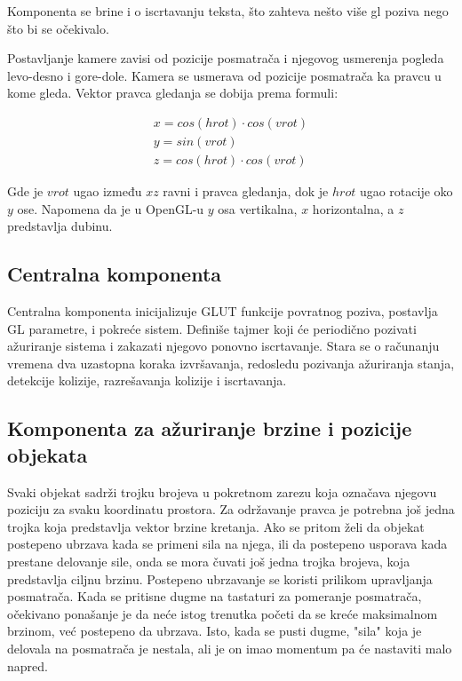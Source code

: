 \documentclass[12pt,oneside]{memoir}
\begin{document}
Komponenta se brine i o iscrtavanju teksta, što zahteva nešto više gl poziva nego što bi se očekivalo.

Postavljanje kamere zavisi od pozicije posmatrača i njegovog usmerenja pogleda levo-desno i gore-dole.
Kamera se usmerava od pozicije posmatrača ka pravcu u kome gleda.
Vektor pravca gledanja se dobija prema formuli:

\begin{equation}
\label{eq:camera}
\begin{split}
x = cos(hrot) \cdot cos(vrot) \\
y = sin(vrot) \\
z = cos(hrot) \cdot  cos(vrot)	
\end{split}
\end{equation}


Gde je $vrot$ ugao između $xz$ ravni i pravca gledanja, dok je $hrot$ ugao rotacije oko $y$ ose.
Napomena da je u OpenGL-u $y$ osa vertikalna, $x$ horizontalna, a $z$ predstavlja dubinu.

\subsection{Centralna komponenta}

Centralna komponenta inicijalizuje GLUT funkcije povratnog poziva, postavlja GL parametre, i pokreće sistem.
Definiše tajmer koji će periodično pozivati ažuriranje sistema i zakazati njegovo ponovno iscrtavanje. 
Stara se o računanju vremena dva uzastopna koraka izvršavanja, redosledu pozivanja ažuriranja stanja,
detekcije kolizije, razrešavanja kolizije i iscrtavanja.

\subsection{Komponenta za ažuriranje brzine i pozicije objekata}

Svaki objekat sadrži trojku brojeva u pokretnom zarezu koja označava njegovu poziciju za svaku koordinatu prostora.
Za održavanje pravca je potrebna još jedna trojka koja predstavlja vektor brzine kretanja.
Ako se pritom želi da objekat postepeno ubrzava kada se primeni sila na njega, ili da postepeno usporava 
kada prestane delovanje sile, onda se mora čuvati još jedna trojka brojeva, koja predstavlja ciljnu brzinu.
Postepeno ubrzavanje se koristi prilikom upravljanja posmatrača. 
Kada se pritisne dugme na tastaturi za pomeranje posmatrača, očekivano ponašanje je da neće istog trenutka 
početi da se kreće maksimalnom brzinom, već postepeno da ubrzava.
Isto, kada se pusti dugme, "sila" koja je delovala na posmatrača je nestala, ali je on imao momentum pa će
nastaviti malo napred.
\end{document}
